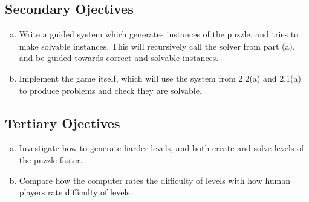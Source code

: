 \subsection{Secondary Ojectives}
\label{subsec:secondary_obj}
\begin{enumerate}[(a)]
    \item Write a guided system which generates instances of the puzzle, and tries to make solvable instances. This will recursively call the solver from part (a), and be guided towards correct and solvable instances.
    \item Implement the game itself, which will use the system from 2.2(a) and 2.1(a) to produce problems and check they are solvable.
\end{enumerate}


\subsection{Tertiary Ojectives}
\label{subsec:tertiary_obj}
\begin{enumerate}[(a)]
    \item Investigate how to generate harder levels, and both create and solve levels of the puzzle faster.
    \item Compare how the computer rates the difficulty of levels with how human players rate difficulty of levels.
\end{enumerate}

